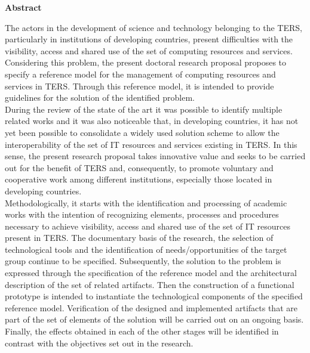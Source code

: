 \newpage
{\huge \textbf{Abstract}}\\



The actors in the development of science and technology belonging to the \acrfull{TERS}, particularly in institutions of developing countries, present difficulties with the visibility, access and shared use of the set of computing resources and services. Considering this problem, the present doctoral research proposal proposes to specify a reference model for the management of computing resources and services in \acrshort{TERS}. Through this reference model, it is intended to provide guidelines for the solution of the identified problem.\\

During the review of the state of the art it was possible to identify multiple related works and it was also noticeable that, in developing countries, it has not yet been possible to consolidate a widely used solution scheme to allow the interoperability of the set of \acrshort{IT} resources and services existing in \acrshort{TERS}. In this sense, the present research proposal takes innovative value and seeks to be carried out for the benefit of \acrshort{TERS} and, consequently, to promote voluntary and cooperative work among different institutions, especially those located in developing countries.\\

Methodologically, it starts with the identification and processing of academic works with the intention of recognizing elements, processes and procedures necessary to achieve visibility, access and shared use of the set of \acrshort{IT} resources present in \acrshort{TERS}. The documentary basis of the research, the selection of technological tools and the identification of needs/opportunities of the target group continue to be specified. Subsequently, the solution to the problem is expressed through the specification of the reference model and the architectural description of the set of related artifacts. Then the construction of a functional prototype is intended to instantiate the technological components of the specified reference model. Verification of the designed and implemented artifacts that are part of the set of elements of the solution will be carried out on an ongoing basis. Finally, the effects obtained in each of the other stages will be identified in contrast with the objectives set out in the research.\\

